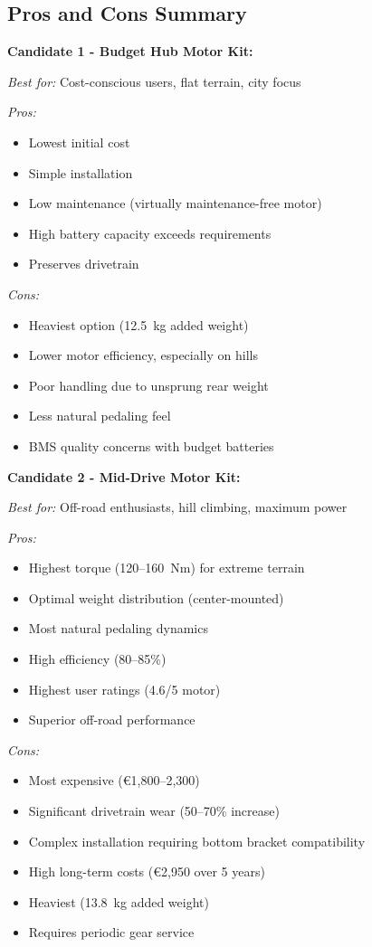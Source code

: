 \documentclass[12pt,a4paper]{article}
\begin{document}
\subsection{Pros and Cons Summary}

\textbf{Candidate 1 - Budget Hub Motor Kit:}

\textit{Best for:} Cost-conscious users, flat terrain, city focus

\textit{Pros:}
\begin{itemize}
    \item Lowest initial cost
    \item Simple installation
    \item Low maintenance (virtually maintenance-free motor)
    \item High battery capacity exceeds requirements
    \item Preserves drivetrain
\end{itemize}

\textit{Cons:}
\begin{itemize}
    \item Heaviest option (12.5~kg added weight)
    \item Lower motor efficiency, especially on hills
    \item Poor handling due to unsprung rear weight
    \item Less natural pedaling feel
    \item BMS quality concerns with budget batteries
\end{itemize}

\textbf{Candidate 2 - Mid-Drive Motor Kit:}

\textit{Best for:} Off-road enthusiasts, hill climbing, maximum power

\textit{Pros:}
\begin{itemize}
    \item Highest torque (120--160~Nm) for extreme terrain
    \item Optimal weight distribution (center-mounted)
    \item Most natural pedaling dynamics
    \item High efficiency (80--85\%)
    \item Highest user ratings (4.6/5 motor)
    \item Superior off-road performance
\end{itemize}

\textit{Cons:}
\begin{itemize}
    \item Most expensive (€1,800--2,300)
    \item Significant drivetrain wear (50--70\% increase)
    \item Complex installation requiring bottom bracket compatibility
    \item High long-term costs (€2,950 over 5 years)
    \item Heaviest (13.8~kg added weight)
    \item Requires periodic gear service
\end{itemize}
\end{document}

